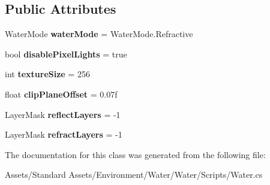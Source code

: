 \subsection*{Public Attributes}
\begin{DoxyCompactItemize}
\item 
Water\+Mode {\bfseries water\+Mode} = Water\+Mode.\+Refractive\hypertarget{class_unity_standard_assets_1_1_water_1_1_water_a88a2cf28e2e546607d17e7be84a6e046}{}\label{class_unity_standard_assets_1_1_water_1_1_water_a88a2cf28e2e546607d17e7be84a6e046}

\item 
bool {\bfseries disable\+Pixel\+Lights} = true\hypertarget{class_unity_standard_assets_1_1_water_1_1_water_a40942de7999cdabaf093aa8e981a758e}{}\label{class_unity_standard_assets_1_1_water_1_1_water_a40942de7999cdabaf093aa8e981a758e}

\item 
int {\bfseries texture\+Size} = 256\hypertarget{class_unity_standard_assets_1_1_water_1_1_water_ad71f94b850d1446efe7e07daa8d4f23f}{}\label{class_unity_standard_assets_1_1_water_1_1_water_ad71f94b850d1446efe7e07daa8d4f23f}

\item 
float {\bfseries clip\+Plane\+Offset} = 0.\+07f\hypertarget{class_unity_standard_assets_1_1_water_1_1_water_a8d9ffae2bf38f3c267e9b40f29bee899}{}\label{class_unity_standard_assets_1_1_water_1_1_water_a8d9ffae2bf38f3c267e9b40f29bee899}

\item 
Layer\+Mask {\bfseries reflect\+Layers} = -\/1\hypertarget{class_unity_standard_assets_1_1_water_1_1_water_ad8e5b877f3c4268919a4b815c495a897}{}\label{class_unity_standard_assets_1_1_water_1_1_water_ad8e5b877f3c4268919a4b815c495a897}

\item 
Layer\+Mask {\bfseries refract\+Layers} = -\/1\hypertarget{class_unity_standard_assets_1_1_water_1_1_water_a25798989345280626fe9a2f9167ee80e}{}\label{class_unity_standard_assets_1_1_water_1_1_water_a25798989345280626fe9a2f9167ee80e}

\end{DoxyCompactItemize}


The documentation for this class was generated from the following file\+:\begin{DoxyCompactItemize}
\item 
Assets/\+Standard Assets/\+Environment/\+Water/\+Water/\+Scripts/Water.\+cs\end{DoxyCompactItemize}

